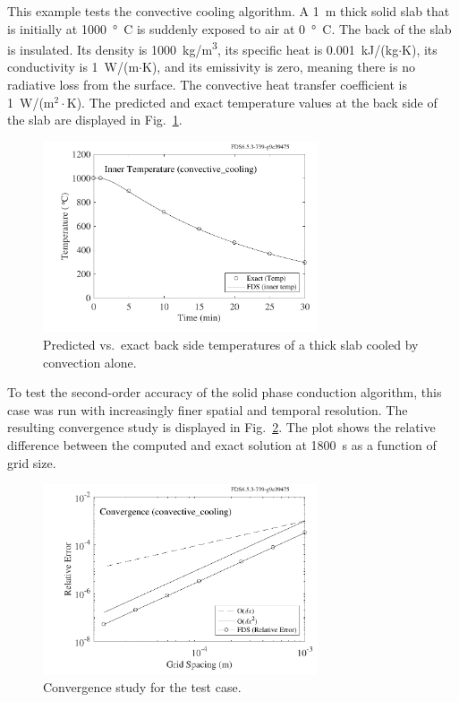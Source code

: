 \documentclass[11pt]{book}
\begin{document}
This example tests the convective cooling algorithm. A 1~m thick solid slab that is initially at 1000~\si{\degree C} is suddenly exposed to air at 0~\si{\degree C}. The back of the slab is insulated. Its density is 1000~\si{kg/m^3}, its specific heat is 0.001~kJ/(kg$\cdot$K), its conductivity is 1~W/(m$\cdot$K), and its emissivity is zero, meaning there is no radiative loss from the surface. The convective heat transfer coefficient is 1~W/(m$^2\cdot$K). The predicted and exact temperature values at the back side of the slab are displayed in Fig.~\ref{convective_cooling}.
\begin{figure}[ht]
\noindent
\begin{center}
\includegraphics[width=3.2in]{SCRIPT_FIGURES/convective_cooling}
\end{center}
\caption[The  test case]{Predicted vs.~exact back side temperatures of a thick slab cooled by convection alone.}
\label{convective_cooling}
\end{figure}
To test the second-order accuracy of the solid phase conduction algorithm, this case was run with increasingly finer spatial and temporal resolution. The resulting convergence study is displayed in Fig.~\ref{convective_cooling_convergence}. The plot shows the relative difference between the computed and exact solution at 1800~s as a function of grid size.
\begin{figure}[ht]
\noindent
\begin{center}
\includegraphics[width=3.2in]{SCRIPT_FIGURES/convective_cooling_error}
\end{center}
\caption[Convergence study for the  test case]{Convergence study for the  test case.}
\label{convective_cooling_convergence}
\end{figure}
\end{document}
